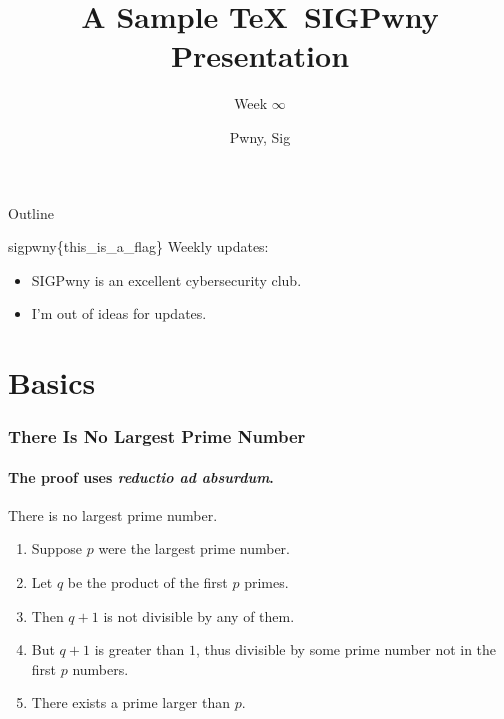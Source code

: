\documentclass[aspectratio=169]{beamer}
\title{A Sample \TeX\ SIGPwny Presentation}
\subtitle{Week $\infty$}
\author{Pwny, Sig}
\date{}
\begin{document}

\begin{frame}
\titlepage
\end{frame}

\begin{frame}{Outline}
  \tableofcontents
\end{frame}

\begin{frame}{sigpwny\{this\_is\_a\_flag\}}
  Weekly updates:
  \begin{itemize}
    \item SIGPwny is an excellent cybersecurity club.
    \item I'm out of ideas for updates.
  \end{itemize}
\end{frame}

\section{Basics}
\frame{\sectionpage}

\begin{frame}
  \frametitle{There Is No Largest Prime Number}
  \framesubtitle{The proof uses \textit{reductio ad absurdum}.}
  \begin{theorem}
    There is no largest prime number.
  \end{theorem}
  \begin{enumerate}
    \item<1-| alert@1> Suppose $p$ were the largest prime number.
    \item<2-> Let $q$ be the product of the first $p$ primes.
    \item<3-> Then $q+1$ is not divisible by any of them.
    \item<4-> But $q + 1$ is greater than $1$, thus divisible by some prime
    number not in the first $p$ numbers.
    \item<5-> There exists a prime larger than $p$.
  \end{enumerate}
\end{frame}
\end{document}
